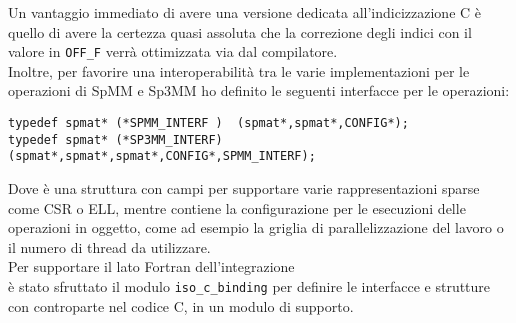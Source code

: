 Un vantaggio immediato di avere una versione dedicata all'indicizzazione C è quello di avere la certezza 
quasi assoluta che la correzione degli indici con il valore  in \verb|OFF_F| verrà ottimizzata via dal compilatore.\\
Inoltre, per favorire una interoperabilità tra le varie implementazioni per le operazioni di SpMM e Sp3MM 
ho definito le seguenti interfacce per le operazioni:
\begin{lstlisting}
typedef spmat* (*SPMM_INTERF )  (spmat*,spmat*,CONFIG*);
typedef spmat* (*SP3MM_INTERF)  (spmat*,spmat*,spmat*,CONFIG*,SPMM_INTERF);
\end{lstlisting}
Dove  è una struttura con campi per supportare varie rappresentazioni sparse 
come CSR o ELL, mentre  contiene la configurazione per le esecuzioni delle operazioni in oggetto,
come ad esempio la griglia di parallelizzazione del lavoro o il numero di thread da utilizzare.\\

Per supportare il lato Fortran dell'integrazione \\è stato sfruttato il modulo \verb|iso_c_binding| 
per definire le interfacce e strutture con controparte nel codice C, in un modulo di supporto.\\

